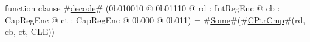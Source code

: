 function clause #\hyperref[sailMIPSzdecode]{decode}# (0b010010 @ 0b01110 @ rd : IntRegEnc @ cb : CapRegEnc @ ct : CapRegEnc @ 0b000 @ 0b011) = #\hyperref[sailMIPSzSome]{Some}#(#\hyperref[sailMIPSzCPtrCmp]{CPtrCmp}#(rd, cb, ct, CLE))
